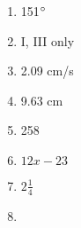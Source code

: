 \documentclass[../uilmath.tex]{subfiles}
\begin{document}
\begin{enumerate}[label=\bfseries\arabic*.]
    \item %
    151$\degree$

    \item %
    I, III only 

    \item %
    2.09 cm/s 

    \item %
    9.63 cm 

    \item %
    258

    \item %
    $12x-23$

    \item %
    $2\frac{1}{4}$

    \item %
    
\end{enumerate}
\end{document}

